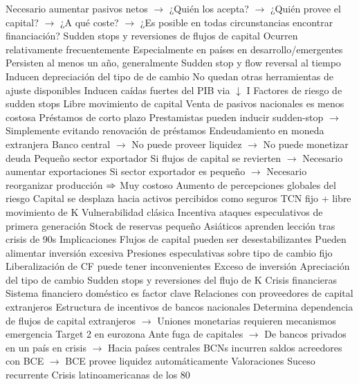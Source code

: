 \documentclass{nuevotema}
\begin{document}
\begin{esquemal}
				\4[] Necesario aumentar pasivos netos
				\4[] $\to$ ¿Quién los acepta?
				\4[] $\to$ ¿Quién provee el capital?
				\4[] $\to$ ¿A qué coste?
				\4[] $\to$ ¿Es posible en todas circunstancias encontrar financiación?
			\3 Sudden stops y reversiones de flujos de capital
				\4 Ocurren relativamente frecuentemente
				\4 Especialmente en países en desarrollo/emergentes
				\4 Persisten al menos un año, generalmente
				\4 Sudden stop y flow reversal al tiempo
				\4 Inducen depreciación del tipo de de cambio
				\4[] No quedan otras herramientas de ajuste disponibles
				\4 Inducen caídas fuertes del PIB via $\downarrow$ I
			\3 Factores de riesgo de sudden stops
				\4 Libre movimiento de capital
				\4[] Venta de pasivos nacionales es menos costosa
				\4 Préstamos de corto plazo
				\4[] Prestamistas pueden inducir sudden-stop
				\4[] $\to$ Simplemente evitando renovación de préstamos
				\4 Endeudamiento en moneda extranjera
				\4[] Banco central
				\4[] $\to$ No puede proveer liquidez
				\4[] $\to$ No puede monetizar deuda
				\4 Pequeño sector exportador
				\4[] Si flujos de capital se revierten
				\4[] $\to$ Necesario aumentar exportaciones
				\4[] Si sector exportador es pequeño
				\4[] $\to$ Necesario reorganizar producción
				\4[] $\Rightarrow$ Muy costoso
				\4 Aumento de percepciones globales del riesgo
				\4[] Capital se desplaza hacia activos percibidos como seguros
				\4 TCN fijo + libre movimiento de K
				\4[] Vulnerabilidad clásica
				\4[] Incentiva ataques especulativos de primera generación
				\4 Stock de reservas pequeño
				\4[] Asiáticos aprenden lección tras crisis de 90s
		\2 Implicaciones
			\3 Flujos de capital pueden ser desestabilizantes
				\4 Pueden alimentar inversión excesiva
				\4 Presiones especulativas sobre tipo de cambio fijo
			\3 Liberalización de CF puede tener inconvenientes
				\4 Exceso de inversión
				\4 Apreciación del tipo de cambio
				\4 Sudden stops y reversiones del flujo de K
				\4 Crisis financieras
			\3 Sistema financiero doméstico es factor clave
				\4 Relaciones con proveedores de capital extranjeros
				\4 Estructura de incentivos de bancos nacionales
				\4[] Determina dependencia de flujos de capital extranjeros
				\4[] $\to$
			\3 Uniones monetarias requieren mecanismos emergencia
				\4 Target 2 en eurozona
				\4[] Ante fuga de capitales
				\4[] $\to$ De bancos privados en un país en crisis
				\4[] $\to$ Hacia países centrales
				\4[] BCNs incurren saldos acreedores con BCE
				\4[] $\to$ BCE provee liquidez automáticamente
		\2 Valoraciones
			\3 Suceso recurrente
				\4 Crisis latinoamericanas de los 80

\end{esquemal}
\end{document}
